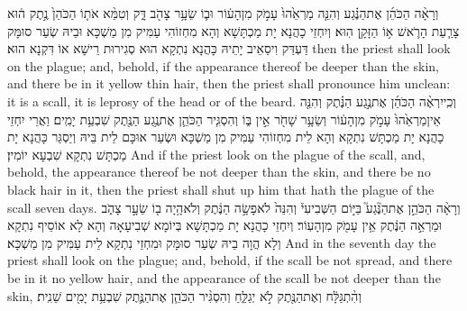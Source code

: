 {וְרָאָ֨ה הַכֹּהֵ֜ן אֶת\maqqaf הַנֶּ֗גַע וְהִנֵּ֤ה מַרְאֵ֙הוּ֙ עָמֹ֣ק מִן\maqqaf הָע֔וֹר וּב֛וֹ שֵׂעָ֥ר צָהֹ֖ב דָּ֑ק וְטִמֵּ֨א אֹת֤וֹ הַכֹּהֵן֙ נֶ֣תֶק ה֔וּא צָרַ֧עַת הָרֹ֛אשׁ א֥וֹ הַזָּקָ֖ן הֽוּא׃}
{וְיִחְזֵי כָהֲנָא יָת מַכְתָּשָׁא וְהָא מִחְזוֹהִי עַמִּיק מִן מַשְׁכָּא וּבֵיהּ שְׂעַר סוּמָּק דַּעְדַּק וִיסַאֵיב יָתֵיהּ כָּהֲנָא נִתְקָא הוּא סְגִירוּת רֵישָׁא אוֹ דִּקְנָא הוּא׃}
{then the priest shall look on the plague; and, behold, if the appearance thereof be deeper than the skin, and there be in it yellow thin hair, then the priest shall pronounce him unclean: it is a scall, it is leprosy of the head or of the beard.}{}
{וְכִֽי\maqqaf יִרְאֶ֨ה הַכֹּהֵ֜ן אֶת\maqqaf נֶ֣גַע הַנֶּ֗תֶק וְהִנֵּ֤ה אֵין\maqqaf מַרְאֵ֙הוּ֙ עָמֹ֣ק מִן\maqqaf הָע֔וֹר וְשֵׂעָ֥ר שָׁחֹ֖ר אֵ֣ין בּ֑וֹ וְהִסְגִּ֧יר הַכֹּהֵ֛ן אֶת\maqqaf נֶ֥גַע הַנֶּ֖תֶק שִׁבְעַ֥ת יָמִֽים׃}
{וַאֲרֵי יִחְזֵי כָהֲנָא יָת מַכְתָּשׁ נִתְקָא וְהָא לֵית מִחְזוֹהִי עַמִּיק מִן מַשְׁכָּא וּשְׂעַר אוּכָּם לֵית בֵּיהּ וְיַסְגַּר כָּהֲנָא יָת מַכְתָּשׁ נִתְקָא שִׁבְעָא יוֹמִין׃}
{And if the priest look on the plague of the scall, and, behold, the appearance thereof be not deeper than the skin, and there be no black hair in it, then the priest shall shut up him that hath the plague of the scall seven days.}{}
{וְרָאָ֨ה הַכֹּהֵ֣ן אֶת\maqqaf הַנֶּ֘גַע֮ בַּיּ֣וֹם הַשְּׁבִיעִי֒ וְהִנֵּה֙ לֹא\maqqaf פָשָׂ֣ה הַנֶּ֔תֶק וְלֹא\maqqaf הָ֥יָה ב֖וֹ שֵׂעָ֣ר צָהֹ֑ב וּמַרְאֵ֣ה הַנֶּ֔תֶק אֵ֥ין עָמֹ֖ק מִן\maqqaf הָעֽוֹר׃}
{וְיִחְזֵי כָהֲנָא יָת מַכְתָּשָׁא בְּיוֹמָא שְׁבִיעָאָה וְהָא לָא אוֹסֵיף נִתְקָא וְלָא הֲוָה בֵיהּ שְׂעַר סוּמָּק וּמִחְזֵי נִתְקָא לֵית עַמִּיק מִן מַשְׁכָּא׃}
{And in the seventh day the priest shall look on the plague; and, behold, if the scall be not spread, and there be in it no yellow hair, and the appearance of the scall be not deeper than the skin,}{}
{וְהִ֨תְ\large גַּ\normalsize לָּ֔ח וְאֶת\maqqaf הַנֶּ֖תֶק לֹ֣א יְגַלֵּ֑חַ וְהִסְגִּ֨יר הַכֹּהֵ֧ן אֶת\maqqaf הַנֶּ֛תֶק שִׁבְעַ֥ת יָמִ֖ים שֵׁנִֽית׃}
